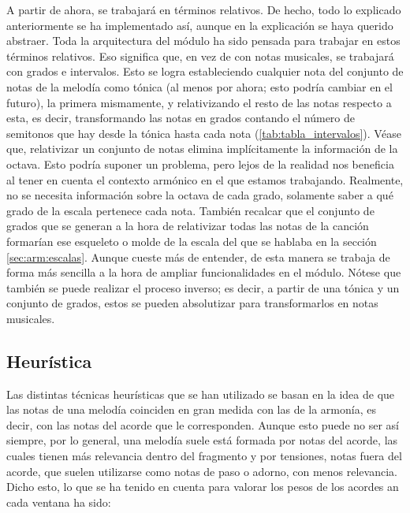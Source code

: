     A partir de ahora, se trabajará en términos relativos. De hecho, todo lo explicado anteriormente se ha implementado así, aunque en la explicación se haya querido abstraer. Toda la arquitectura del módulo ha sido pensada para trabajar en estos términos relativos. Eso significa que, en vez de con notas musicales, se trabajará con grados e intervalos. Esto se logra estableciendo cualquier nota del conjunto de notas de la melodía como tónica (al menos por ahora; esto podría cambiar en el futuro), la primera mismamente, y relativizando el resto de las notas respecto a esta, es decir, transformando las notas en grados contando el número de semitonos que hay desde la tónica hasta cada nota (\ref{tab:tabla_intervalos}). Véase que, relativizar un conjunto de notas elimina implícitamente la información de la octava. Esto podría suponer un problema, pero lejos de la realidad nos beneficia al tener en cuenta el contexto armónico en el que estamos trabajando. Realmente, no se necesita  información sobre la octava de cada grado, solamente saber a qué grado de la escala pertenece cada nota. También recalcar que el conjunto de grados que se generan a la hora de relativizar todas las notas de la canción formarían ese esqueleto o molde de la escala del que se hablaba en la sección \ref{sec:arm:escalas}. Aunque cueste más de entender, de esta manera se trabaja de forma más sencilla a la hora de ampliar funcionalidades en el módulo. Nótese que también se puede realizar el proceso inverso; es decir, a partir de una tónica y un conjunto de grados, estos se pueden absolutizar para transformarlos en notas musicales.

\subsection{Heurística} 

    Las distintas técnicas heurísticas que se han utilizado se basan en la idea de que las notas de una melodía coinciden en gran medida con las de la armonía, es decir, con las notas del acorde que le corresponden. Aunque esto puede no ser así siempre, por lo general, una melodía suele está formada por notas del acorde, las cuales tienen más relevancia dentro del fragmento y por tensiones, notas fuera del acorde, que suelen utilizarse como notas de paso o adorno, con menos relevancia. Dicho esto, lo que se ha tenido en cuenta para valorar los pesos de los acordes an cada ventana ha sido:

